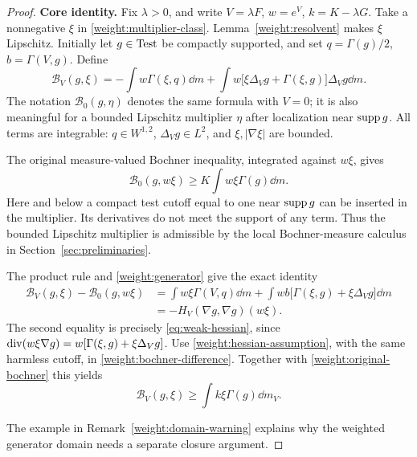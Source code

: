 \begin{proof}
\textbf{Core identity.}
Fix \(\lambda>0\), and write \(V=\lambda F\), \(w=e^V\),
\(k=K-\lambda G\). Take a nonnegative \(\xi\) in
\eqref{weight:multiplier-class}. Lemma~\ref{weight:resolvent}
makes \(\xi\) Lipschitz. Initially let \(g\in\operatorname{Test}\) be
compactly supported, and set
\(q=\Gamma(g)/2\), \(b=\Gamma(V,g)\). Define
\begin{equation}
\label{weight:integrated-bochner}
\mathcal B_V(g,\xi)
=-\int w\Gamma(\xi,q)\dd m
 +\int w\bigl[\xi\Delta_Vg+\Gamma(\xi,g)\bigr]
                  \Delta_Vg\dd m.
\end{equation}
The notation \(\mathcal B_0(g,\eta)\) denotes the same formula
with \(V=0\); it is also meaningful for a bounded Lipschitz
multiplier \(\eta\) after localization near \(\operatorname{supp} g\).
All terms are integrable: \(q\in W^{1,2}\),
\(\Delta_Vg\in L^2\), and \(\xi,|\nabla\xi|\) are bounded.

The original measure-valued Bochner inequality, integrated against
\(w\xi\), gives
\begin{equation}
\label{weight:original-bochner}
\mathcal B_0(g,w\xi)
\ge K\int w\xi\Gamma(g)\dd m.
\end{equation}
Here and below a compact test cutoff equal to one near
\(\operatorname{supp} g\) can be inserted in the multiplier. Its derivatives
do not meet the support of any term. Thus the bounded Lipschitz
multiplier is admissible by the local Bochner-measure calculus
in Section~\ref{sec:preliminaries}.

The product rule and \eqref{weight:generator} give the exact identity
\begin{align}
\label{weight:bochner-difference}
\mathcal B_V(g,\xi)-\mathcal B_0(g,w\xi)
 &=\int w\xi\Gamma(V,q)\dd m
   +\int wb\bigl[\Gamma(\xi,g)+\xi\Delta_Vg\bigr]\dd m\nonumber\\
 &=-H_V(\nabla g,\nabla g)(w\xi).
\end{align}
The second equality is precisely \eqref{eq:weak-hessian}, since
\(\operatorname{div}(w\xi\nabla g)=w[\Gamma(\xi,g)+\xi\Delta_Vg]\).
Use \eqref{weight:hessian-assumption}, with the same harmless
cutoff, in \eqref{weight:bochner-difference}. Together with
\eqref{weight:original-bochner} this yields
\begin{equation}
\label{weight:core-be}
\mathcal B_V(g,\xi)\ge\int k\xi\Gamma(g)\dd m_V.
\end{equation}

The example in Remark~\ref{weight:domain-warning} explains why
the weighted generator domain needs a separate closure argument.


\end{proof}
